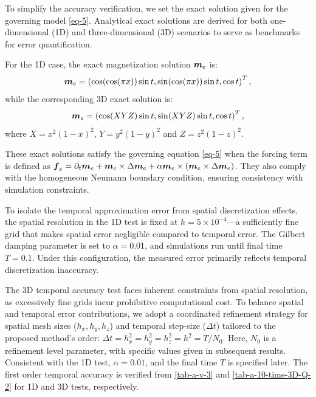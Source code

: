 \documentclass[preprint,times,3p]{elsarticle}
\def\f{\mbox{\boldmath $f$}}
\def\m{\mbox{\boldmath $m$}}
\begin{document}
To simplify the accuracy verification, we set the exact solution given for the governing model \cref{eq-5}. Analytical exact solutions are derived for both one-dimensional (1D) and three-dimensional (3D) scenarios to serve as benchmarks for error quantification.

For the 1D case, the exact magnetization solution \(\m_e\) is:
\begin{equation*}
\m_e=\left(\cos(\cos(\pi x))\sin t, \sin(\cos(\pi x))\sin t, \cos t\right)^T,
\end{equation*}
while the corresponding 3D exact solution is:
\begin{equation*}
\m_e=\left(\cos(XYZ)\sin t, \sin(XYZ)\sin t, \cos t\right)^T,
\end{equation*}
where $X=x^2(1-x)^2$, $Y=y^2(1-y)^2$ and $Z=z^2(1-z)^2$.

These exact solutions satisfy the governing equation \cref{eq-5} when the forcing term is defined as \(\f_e=\partial_t \m_e+\m_e \times \Delta \m_e+\alpha\m_e\times (\m_e \times \Delta \m_e)\). They also comply with the homogeneous Neumann boundary condition, ensuring consistency with simulation constraints.

To isolate the temporal approximation error from spatial discretization effects, the spatial resolution in the 1D test is fixed at \(h=5\times 10^{-4}\)—a sufficiently fine grid that makes spatial error negligible compared to temporal error. The Gilbert damping parameter is set to \(\alpha=0.01\), and simulations run until final time \(T=0.1\). Under this configuration, the measured error primarily reflects temporal discretization inaccuracy.

The 3D temporal accuracy test faces inherent constraints from spatial resolution, as excessively fine grids incur prohibitive computational cost. To balance spatial and temporal error contributions, we adopt a coordinated refinement strategy for spatial mesh sizes (\(h_x, h_y, h_z\)) and temporal step-size (\(\Delta t\)) tailored to the proposed method's order: \(\Delta t=h_x^2=h_y^2=h_z^2=h^2=T/N_0\). Here, \(N_0\) is a refinement level parameter, with specific values given in subsequent results. Consistent with the 1D test, \(\alpha=0.01\), and the final time \(T\) is specified later. The first order temporal accuracy is verified from \cref{tab-a-v-3} and \cref{tab-a-10-time-3D-Q-2} for 1D and 3D tests, respectively. 
\end{document}
